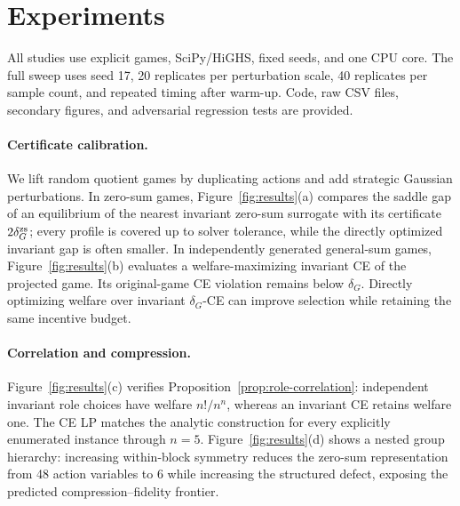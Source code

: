 \section{Experiments}

All studies use explicit games, SciPy/HiGHS, fixed seeds, and one CPU core.  The full sweep uses seed 17, 20 replicates per perturbation scale, 40 replicates per sample count, and repeated timing after warm-up.  Code, raw CSV files, secondary figures, and adversarial regression tests are provided.

\paragraph{Certificate calibration.}
We lift random quotient games by duplicating actions and add strategic Gaussian perturbations.  In zero-sum games, Figure~\ref{fig:results}(a) compares the saddle gap of an equilibrium of the nearest invariant zero-sum surrogate with its certificate $2\delta_G^{\mathrm{zs}}$; every profile is covered up to solver tolerance, while the directly optimized invariant gap is often smaller.  In independently generated general-sum games, Figure~\ref{fig:results}(b) evaluates a welfare-maximizing invariant CE of the projected game.  Its original-game CE violation remains below $\delta_G$.  Directly optimizing welfare over invariant $\delta_G$-CE can improve selection while retaining the same incentive budget.

\paragraph{Correlation and compression.}
Figure~\ref{fig:results}(c) verifies Proposition~\ref{prop:role-correlation}: independent invariant role choices have welfare $n!/n^n$, whereas an invariant CE retains welfare one.  The CE LP matches the analytic construction for every explicitly enumerated instance through $n=5$.  Figure~\ref{fig:results}(d) shows a nested group hierarchy: increasing within-block symmetry reduces the zero-sum representation from 48 action variables to 6 while increasing the structured defect, exposing the predicted compression--fidelity frontier.


